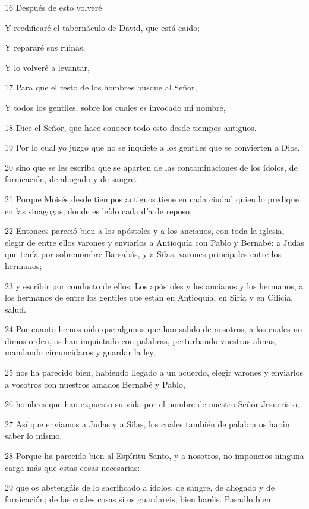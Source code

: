 \par 16 Después de esto volveré
\par Y reedificaré el tabernáculo de David, que está caído;
\par Y repararé sus ruinas,
\par Y lo volveré a levantar,
\par 17 Para que el resto de los hombres busque al Señor,
\par Y todos los gentiles, sobre los cuales es invocado mi nombre,
\par 18 Dice el Señor, que hace conocer todo esto desde tiempos antiguos.
\par 19 Por lo cual yo juzgo que no se inquiete a los gentiles que se convierten a Dios,
\par 20 sino que se les escriba que se aparten de las contaminaciones de los ídolos, de fornicación, de ahogado y de sangre.
\par 21 Porque Moisés desde tiempos antiguos tiene en cada ciudad quien lo predique en las sinagogas, donde es leído cada día de reposo.
\par 22 Entonces pareció bien a los apóstoles y a los ancianos, con toda la iglesia, elegir de entre ellos varones y enviarlos a Antioquía con Pablo y Bernabé: a Judas que tenía por sobrenombre Barsabás, y a Silas, varones principales entre los hermanos;
\par 23 y escribir por conducto de ellos: Los apóstoles y los ancianos y los hermanos, a los hermanos de entre los gentiles que están en Antioquía, en Siria y en Cilicia, salud.
\par 24 Por cuanto hemos oído que algunos que han salido de nosotros, a los cuales no dimos orden, os han inquietado con palabras, perturbando vuestras almas, mandando circuncidaros y guardar la ley,
\par 25 nos ha parecido bien, habiendo llegado a un acuerdo, elegir varones y enviarlos a vosotros con nuestros amados Bernabé y Pablo,
\par 26 hombres que han expuesto su vida por el nombre de nuestro Señor Jesucristo.
\par 27 Así que enviamos a Judas y a Silas, los cuales también de palabra os harán saber lo mismo.
\par 28 Porque ha parecido bien al Espíritu Santo, y a nosotros, no imponeros ninguna carga más que estas cosas necesarias:
\par 29 que os abstengáis de lo sacrificado a ídolos, de sangre, de ahogado y de fornicación; de las cuales cosas si os guardareis, bien haréis. Pasadlo bien.
